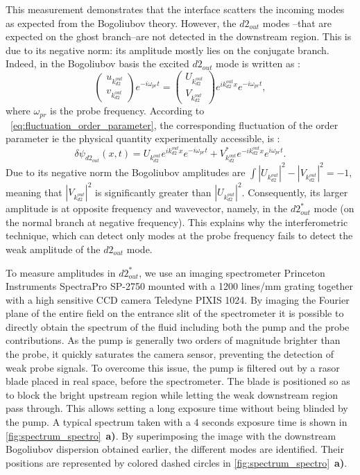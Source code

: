 This measurement demonstrates that the interface scatters the incoming modes as expected from the Bogoliubov theory. However, the $d2_{out}$ modes --that are expected on the ghost branch--are not detected in the downstream region. This is due to its negative norm: its amplitude mostly lies on the conjugate branch.
Indeed, in the Bogoliubov basis the excited $d2_{out}$ mode is written as :
\begin{equation}
    \begin{pmatrix}
        u_{k_{d2}^{out}} \\
        v_{k_{d2}^{out}}
    \end{pmatrix}e^{-i\omega_{pr}t}=
    \begin{pmatrix}
    U_{k_{d2}^{out}} \\
    V_{k_{d2}^{out}}
    \end{pmatrix}e^{ik_{d2}^{out}x}e^{-i\omega_{pr}t}, 
\end{equation}
where $\omega_{pr}$ is the probe frequency. According to ~\ref{eq:fluctuation_order_parameter}, the corresponding fluctuation of the order parameter ie the physical quantity experimentally accessible, is :
\begin{equation}
    \delta\psi_{{d2_{out}}}(x,t)= U_{k_{d2}^{out}}e^{ik_{d2}^{out}x}e^{-i\omega_{pr}t}+V_{k_{d2}^{out}}^*e^{-ik_{d2}^{out}x}e^{i\omega_{pr}t}.
    \label{eq:order_param_d2_out}
\end{equation}
Due to its negative norm the Bogoliubov amplitudes are $\int |U_{k_{d2}^{out}}|^2-|V_{k_{d2}^{out}}|^2=-1$, meaning that  $|V_{k_{d2}^{out}}|^2$ is significantly greater than $|U_{k_{d2}^{out}}|^2$. 
Consequently, its larger amplitude is at opposite frequency and wavevector, namely, in the $d2_{out}^*$ mode (on the normal branch at negative frequency). This explains why the interferometric technique, which 
can detect only modes at the probe frequency fails to detect the weak amplitude of the $d2_{out}$ mode.

To measure amplitudes in $d2_{out}^*$, we use an imaging spectrometer Princeton Instruments SpectraPro SP-2750 mounted with a 1200 lines/mm grating together with a high sensitive CCD camera Teledyne PIXIS 1024. By imaging the Fourier plane of the entire field on the entrance slit of the spectrometer it is possible to directly obtain the spectrum of the fluid including both the pump and the probe contributions.
As the pump is generally two orders of magnitude brighter than the probe, it quickly saturates the camera sensor, preventing the detection of weak probe signals.
To overcome this issue, the pump is filtered out by a rasor blade placed in real space, before the spectrometer. The blade is positioned so as to block the bright upstream region while letting the weak downstream region pass through.
This allows setting a long exposure time without being blinded by the pump. A typical spectrum taken with a 4 seconds exposure time is shown in \autoref{fig:spectrum_spectro}~\textbf{a)}. By superimposing the image with the downstream Bogoliubov dispersion obtained earlier, the different modes are identified.
Their positions are represented by colored dashed circles in \autoref{fig:spectrum_spectro}~\textbf{a)}.

